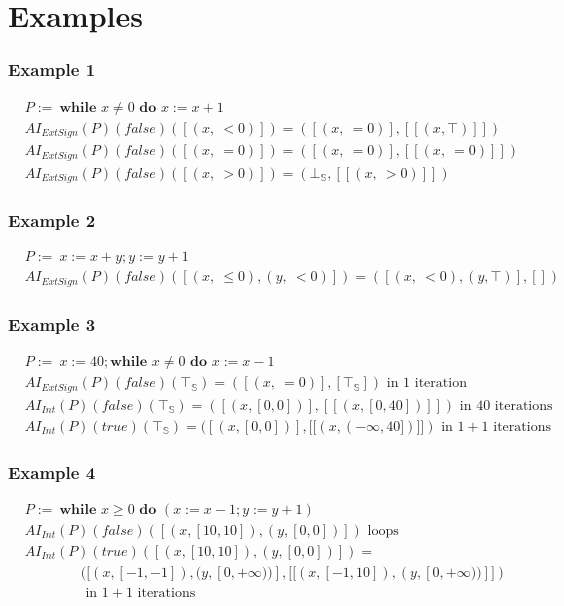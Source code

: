 \documentclass{beamer}
\begin{document}
\section{Examples}

\begin{frame}
    \frametitle{Example 1}
    \begin{align*}
        &P :=\ \textbf {while } x \ne 0 \textbf { do } x := x + 1 \\
        &AI_{ExtSign} (P) (false) ([(x,\ < 0)]) = ([(x,\ = 0)], [[(x, \top)]]) \\
        &AI_{ExtSign} (P) (false) ([(x,\ = 0)]) = ([(x,\ = 0)], [[(x,\ = 0)]]) \\
        &AI_{ExtSign} (P) (false) ([(x,\ > 0)]) = (\bot_\mathbb{S}, [[(x,\ > 0)]]) 
    \end{align*}
\end{frame}

\begin{frame}
    \frametitle{Example 2}
    \begin{align*}
        &P :=\ x := x + y; y := y + 1 \\
        &AI_{ExtSign} (P) (false) ([(x,\ \le 0), (y,\ < 0)]) = ([(x,\ < 0), (y,\top)], [])
    \end{align*}
\end{frame}

\begin{frame}
    \frametitle{Example 3}
    \begin{align*}
        &P :=\ x := 40; \textbf {while } x \ne 0 \textbf { do } x := x - 1 \\
        &AI_{ExtSign} (P) (false) (\top_\mathbb{S}) = ([(x,\ = 0)], [\top_\mathbb{S}]) \text{ in $1$ iteration}\\
        &AI_{Int} (P) (false) (\top_\mathbb{S}) = ([(x, [0, 0])], [[(x, [0, 40])]]) \text{ in $40$ iterations}\\
        &AI_{Int} (P) (true) (\top_\mathbb{S}) = ([(x, [0, 0])], [[(x, (-\infty, 40])]]) \text{ in $1 + 1$ iterations}
    \end{align*}
\end{frame}

\begin{frame}
    \frametitle{Example 4}
    \begin{align*}
        &P :=\ \textbf {while } x \ge 0 \textbf { do } (x := x - 1; y := y + 1) \\
        &AI_{Int} (P) (false) ([(x, [10, 10]), (y, [0, 0])]) \text{ loops} \\
        &AI_{Int} (P) (true) ([(x, [10, 10]), (y, [0, 0])]) =\\
        & \qquad \qquad ([(x, [-1, -1]), (y, [0, +\infty))], [[(x, [-1, 10]), (y, [0, +\infty))]]) \\
        & \qquad \qquad \text{ in $1 + 1$ iterations}
    \end{align*}
\end{frame}
\end{document}
